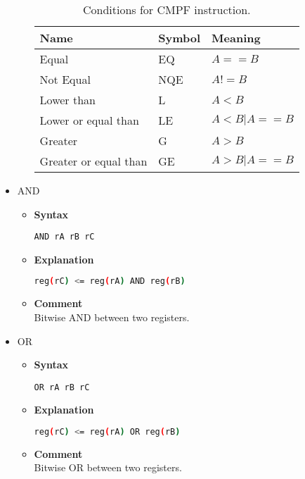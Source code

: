 \begin{itemize}
\begin{itemize}
    \begin{table}[h]
        \centering
        \begin{tabular}{|l|l|l|}
            \hline
            \textbf{Name}             & \textbf{Symbol} & \textbf{Meaning}      \\ \hline
            Equal                     & EQ              & $A==B$                \\ \hline
            Not Equal                 & NQE             & $A!=B$                \\ \hline
            Lower than                & L               & $A<B$                 \\ \hline
            Lower or equal than       & LE              & $A<B | A==B$          \\ \hline
            Greater                   & G               & $A>B$                 \\ \hline
            Greater or equal than     & GE              & $A>B | A==B$          \\ \hline
        \end{tabular}
        \caption{Conditions for CMPF instruction.}
        \label{tab:cmp_conds_f}
    \end{table}

    \end{itemize}

    \item AND
    \begin{itemize}
        \item \textbf{Syntax}
        \begin{lstlisting}[language={[markII]Assembler}, frame=single]
    AND rA rB rC
        \end{lstlisting}
        \item \textbf{Explanation}
        \begin{lstlisting}[language=bash, frame=single]
    reg(rC) <= reg(rA) AND reg(rB)
        \end{lstlisting}
        \item \textbf{Comment} \\
    Bitwise AND between two registers.
    \end{itemize}

    \item OR
    \begin{itemize}
        \item \textbf{Syntax}
        \begin{lstlisting}[language={[markII]Assembler}, frame=single]
    OR rA rB rC
        \end{lstlisting}
        \item \textbf{Explanation}
        \begin{lstlisting}[language=bash, frame=single]
    reg(rC) <= reg(rA) OR reg(rB)
        \end{lstlisting}
        \item \textbf{Comment} \\
    Bitwise OR between two registers.
    \end{itemize}


\end{itemize}
